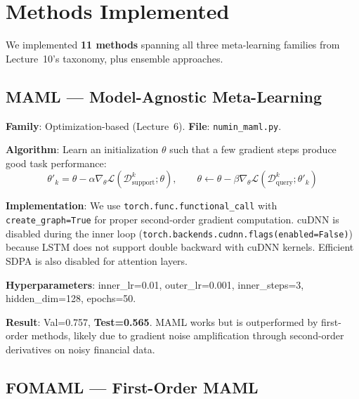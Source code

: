 \documentclass[11pt,a4paper]{article}
\begin{document}
\section{Methods Implemented}

We implemented \textbf{11 methods} spanning all three meta-learning families from Lecture~10's taxonomy, plus ensemble approaches.

\subsection{MAML --- Model-Agnostic Meta-Learning~\cite{finn2017}}

\textbf{Family}: Optimization-based (Lecture~6). \textbf{File}: \texttt{numin\_maml.py}.

\textbf{Algorithm}: Learn an initialization $\theta$ such that a few gradient steps produce good task performance:
\begin{equation}
  \theta'_k = \theta - \alpha \nabla_\theta \mathcal{L}(\mathcal{D}_{\text{support}}^k; \theta), \qquad \theta \leftarrow \theta - \beta \nabla_\theta \mathcal{L}(\mathcal{D}_{\text{query}}^k; \theta'_k)
\end{equation}

\textbf{Implementation}: We use \texttt{torch.func.functional\_call} with \texttt{create\_graph=True} for proper second-order gradient computation. cuDNN is disabled during the inner loop (\texttt{torch.backends.cudnn.flags(enabled=False)}) because LSTM does not support double backward with cuDNN kernels. Efficient SDPA is also disabled for attention layers.

\textbf{Hyperparameters}: inner\_lr=0.01, outer\_lr=0.001, inner\_steps=3, hidden\_dim=128, epochs=50.

\textbf{Result}: Val=0.757, \textbf{Test=0.565}. MAML works but is outperformed by first-order methods, likely due to gradient noise amplification through second-order derivatives on noisy financial data.

\subsection{FOMAML --- First-Order MAML}
\end{document}
